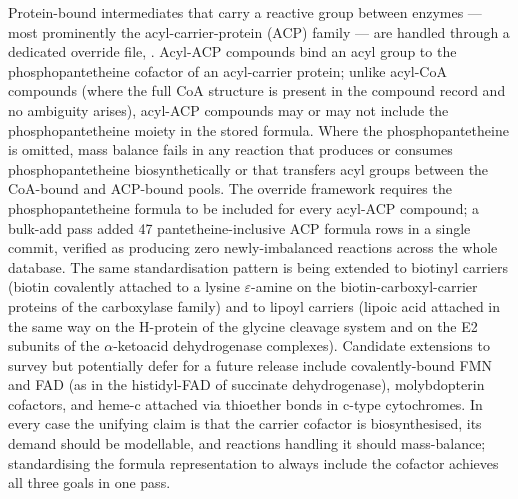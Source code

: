 Protein-bound intermediates that carry a reactive group between enzymes --- most
prominently the acyl-carrier-protein (ACP) family --- are handled through a
dedicated override file,
. Acyl-ACP
compounds bind an acyl group to the phosphopantetheine cofactor of an
acyl-carrier protein; unlike acyl-CoA compounds (where the full CoA structure is
present in the compound record and no ambiguity arises), acyl-ACP compounds may
or may not include the phosphopantetheine moiety in the stored formula. Where
the phosphopantetheine is omitted, mass balance fails in any reaction that
produces or consumes phosphopantetheine biosynthetically or that transfers acyl
groups between the CoA-bound and ACP-bound pools. The override framework
requires the phosphopantetheine formula to be included for every acyl-ACP
compound; a bulk-add pass added 47 pantetheine-inclusive ACP formula rows in a
single commit, verified as producing zero newly-imbalanced reactions across the
whole database. The same standardisation pattern is being extended to biotinyl
carriers (biotin covalently attached to a lysine $\varepsilon$-amine on the
biotin-carboxyl-carrier proteins of the carboxylase family) and to lipoyl
carriers (lipoic acid attached in the same way on the H-protein of the glycine
cleavage system and on the E2 subunits of the $\alpha$-ketoacid dehydrogenase
complexes). Candidate extensions to survey but potentially defer for a future
release include covalently-bound FMN and FAD (as in the histidyl-FAD of
succinate dehydrogenase), molybdopterin cofactors, and heme-c attached via
thioether bonds in c-type cytochromes. In every case the unifying claim is that
the carrier cofactor is biosynthesised, its demand should be modellable, and
reactions handling it should mass-balance; standardising the formula
representation to always include the cofactor achieves all three goals in one
pass.
